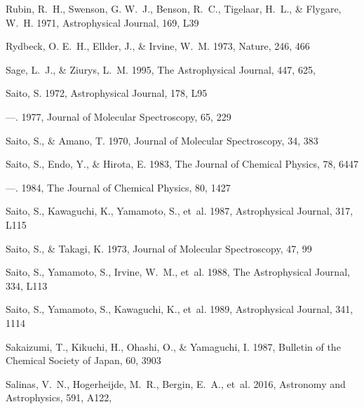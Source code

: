 \documentclass[twocolumn]{aastex631}
\begin{document}
\begin{thebibliography}{}
Rubin, R.~H., Swenson, G. W.~J., Benson, R.~C., Tigelaar, H.~L., \& Flygare,
  W.~H. 1971, Astrophysical Journal, 169, L39

Rydbeck, O. E.~H., Ellder, J., \& Irvine, W.~M. 1973, Nature, 246, 466

{Sage}, L.~J., \& {Ziurys}, L.~M. 1995, The Astrophysical Journal, 447, 625,

Saito, S. 1972, Astrophysical Journal, 178, L95

---. 1977, Journal of Molecular Spectroscopy, 65, 229

Saito, S., \& Amano, T. 1970, Journal of Molecular Spectroscopy, 34, 383

Saito, S., Endo, Y., \& Hirota, E. 1983, The Journal of Chemical Physics, 78,
  6447

---. 1984, The Journal of Chemical Physics, 80, 1427

Saito, S., Kawaguchi, K., Yamamoto, S., {et~al.} 1987, Astrophysical Journal,
  317, L115

Saito, S., \& Takagi, K. 1973, Journal of Molecular Spectroscopy, 47, 99

Saito, S., Yamamoto, S., Irvine, W.~M., {et~al.} 1988, The Astrophysical
  Journal, 334, L113

Saito, S., Yamamoto, S., Kawaguchi, K., {et~al.} 1989, Astrophysical Journal,
  341, 1114

Sakaizumi, T., Kikuchi, H., Ohashi, O., \& Yamaguchi, I. 1987, Bulletin of the
  Chemical Society of Japan, 60, 3903

{Salinas}, V.~N., {Hogerheijde}, M.~R., {Bergin}, E.~A., {et~al.} 2016,
  Astronomy and Astrophysics, 591, A122, 


\end{thebibliography}
\end{document}
